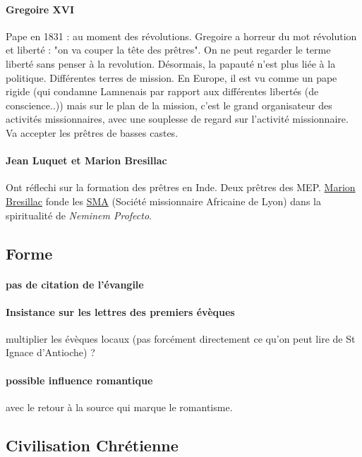 \paragraph{Gregoire XVI} Pape en 1831 : au moment des révolutions. Gregoire a horreur du mot révolution et liberté : "on va couper la tête des prêtres". On ne peut regarder le terme liberté sans penser à la revolution.
Désormais, la papauté n'est plus liée à la politique.
Différentes terres de mission.
En Europe, il est vu comme un pape rigide (qui condamne Lamnenais par rapport aux différentes libertés (de conscience..)) mais sur le plan de la mission, c'est le grand organisateur des activités missionnaires, avec une souplesse de regard sur l'activité missionnaire.
Va accepter les prêtres de basses castes. 

\paragraph{Jean Luquet et Marion Bresillac} Ont réflechi sur la formation des prêtres en Inde. Deux prêtres des MEP. \href{https://fr.wikipedia.org/wiki/Melchior_de_Marion-Br%C3%A9sillac}{Marion Bresillac} fonde les \href{https://www.missions-africaines.net/}{SMA} (Société missionnaire Africaine de Lyon) dans la spiritualité de \textit{Neminem Profecto}.

\subsection{Forme}

\paragraph{pas de citation de l'évangile}


\paragraph{Insistance sur les lettres des premiers évèques} multiplier les évèques locaux (pas forcément directement ce qu'on peut lire de St Ignace d'Antioche) ?

\paragraph{possible influence romantique} avec le retour à la source qui marque le romantisme.


\subsection{Civilisation Chrétienne}
